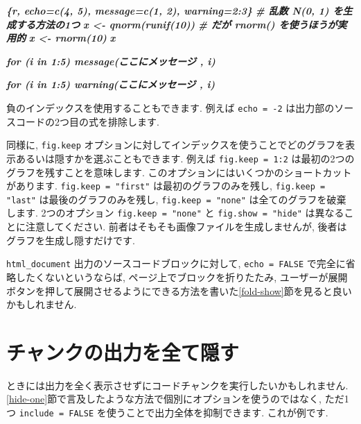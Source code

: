 \documentclass[
  11pt,
]{bxjsreport}
\newenvironment{Shaded}{\begin{snugshade}}{\end{snugshade}}
\newcommand{\InformationTok}[1]{\textcolor[rgb]{0.56,0.35,0.01}{\textbf{\textit{#1}}}}
\begin{document}
\begin{Shaded}
\begin{Highlighting}[]
\InformationTok{\textasciigrave{}\textasciigrave{}\textasciigrave{}\{r, echo=c(4, 5), message=c(1, 2), warning=2:3\}}
\InformationTok{\# 乱数 N(0, 1) を生成する方法の1つ}
\InformationTok{x \textless{}{-} qnorm(runif(10))}
\InformationTok{\# だが rnorm() を使うほうが実用的}
\InformationTok{x \textless{}{-} rnorm(10)}
\InformationTok{x}

\InformationTok{for (i in 1:5) message(\textquotesingle{}ここにメッセージ \textquotesingle{}, i)}

\InformationTok{for (i in 1:5) warning(\textquotesingle{}ここにメッセージ \textquotesingle{}, i)}
\InformationTok{\textasciigrave{}\textasciigrave{}\textasciigrave{}}
\end{Highlighting}
\end{Shaded}

負のインデックスを使用することもできます. 例えば \texttt{echo = -2} は出力部のソースコードの2つ目の式を排除します.

同様に, \texttt{fig.keep} オプションに対してインデックスを使うことでどのグラフを表示あるいは隠すかを選ぶこともできます. 例えば \texttt{fig.keep = 1:2} は最初の2つのグラフを残すことを意味します. このオプションにはいくつかのショートカットがあります. \texttt{fig.keep = "first"} は最初のグラフのみを残し, \texttt{fig.keep = "last"} は最後のグラフのみを残し, \texttt{fig.keep = "none"} は全てのグラフを破棄します. 2つのオプション \texttt{fig.keep = "none"} と \texttt{fig.show = "hide"} は異なることに注意してください. 前者はそもそも画像ファイルを生成しませんが, 後者はグラフを生成し隠すだけです.

\texttt{html\_document} 出力のソースコードブロックに対して, \texttt{echo = FALSE} で完全に省略したくないというならば, ページ上でブロックを折りたたみ, ユーザーが展開ボタンを押して展開させるようにできる方法を書いた\ref{fold-show}節を見ると良いかもしれません.

\hypertarget{hide-all}{%
\section{チャンクの出力を全て隠す}\label{hide-all}}

ときには出力を全く表示させずにコードチャンクを実行したいかもしれません. \ref{hide-one}節で言及したような方法で個別にオプションを使うのではなく, ただ1つ \texttt{include = FALSE} を使うことで出力全体を抑制できます. これが例です.
\end{document}
